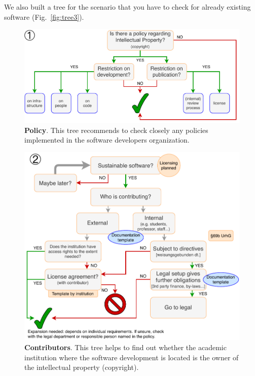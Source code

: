 \documentclass[a4paper,num-refs,numbers,sort&compress]{de-rse}
\begin{document}
We also built a tree for the scenario that you have to check for already existing software (Fig.~\ref{fig:tree3}).

\begin{figure}[tb]
  \centering
  \includegraphics[scale=0.5]{tree_IP_policy}
  \caption{\textbf{Policy}. This tree recommends to check closely any policies implemented in the software developers organization.}
  \label{fig:tree0}
\end{figure}

\begin{figure}[tb]
  \centering
  \includegraphics[scale=0.5]{figures/tree_sustainable_software}
  \caption{\textbf{Contributors}. This tree helps to find out whether the academic institution where the software development is located is the owner of the intellectual property (copyright).}
  \label{fig:tree1}
\end{figure}
\end{document}
